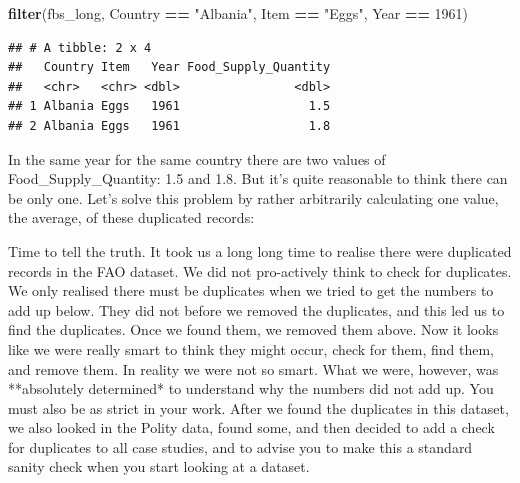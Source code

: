 \documentclass[]{book}
\newenvironment{Shaded}{\begin{snugshade}}{\end{snugshade}}
\newcommand{\DataTypeTok}[1]{\textcolor[rgb]{0.13,0.29,0.53}{#1}}
\newcommand{\DecValTok}[1]{\textcolor[rgb]{0.00,0.00,0.81}{#1}}
\newcommand{\KeywordTok}[1]{\textcolor[rgb]{0.13,0.29,0.53}{\textbf{#1}}}
\newcommand{\NormalTok}[1]{#1}
\newcommand{\OperatorTok}[1]{\textcolor[rgb]{0.81,0.36,0.00}{\textbf{#1}}}
\newcommand{\StringTok}[1]{\textcolor[rgb]{0.31,0.60,0.02}{#1}}
\begin{document}
\begin{Shaded}
\begin{Highlighting}[]
\KeywordTok{filter}\NormalTok{(fbs_long,}
\NormalTok{       Country }\OperatorTok{==}\StringTok{ "Albania"}\NormalTok{,}
\NormalTok{       Item }\OperatorTok{==}\StringTok{ "Eggs"}\NormalTok{,}
\NormalTok{       Year }\OperatorTok{==}\StringTok{ }\DecValTok{1961}\NormalTok{)}
\end{Highlighting}
\end{Shaded}

\begin{verbatim}
## # A tibble: 2 x 4
##   Country Item   Year Food_Supply_Quantity
##   <chr>   <chr> <dbl>                <dbl>
## 1 Albania Eggs   1961                  1.5
## 2 Albania Eggs   1961                  1.8
\end{verbatim}

In the same year for the same country there are two values of Food\_Supply\_Quantity: 1.5 and 1.8. But it's quite reasonable to think there can be only one. Let's solve this problem by rather arbitrarily calculating one value, the average, of these duplicated records:

\begin{Shaded}
\end{Shaded}

\begin{info}
Time to tell the truth. It took us a long long time to realise there
were duplicated records in the FAO dataset. We did not pro-actively
think to check for duplicates. We only realised there must be duplicates
when we tried to get the numbers to add up below. They did not before we
removed the duplicates, and this led us to find the duplicates. Once we
found them, we removed them above. Now it looks like we were really
smart to think they might occur, check for them, find them, and remove
them. In reality we were not so smart. What we were, however, was
**absolutely determined* to understand why the numbers did not add up.
You must also be as strict in your work. After we found the duplicates
in this dataset, we also looked in the Polity data, found some, and then
decided to add a check for duplicates to all case studies, and to advise
you to make this a standard sanity check when you start looking at a
dataset.
\end{info}
\end{document}
